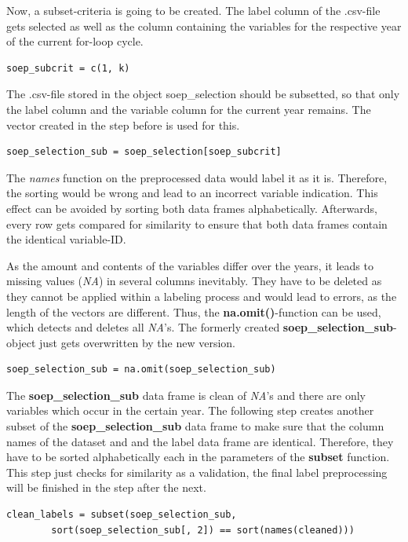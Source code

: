\documentclass[a4paper]{article}
\begin{document}
Now, a subset-criteria is going to be created. The label column of the .csv-file gets selected as well as the column containing the variables for the respective year of the current for-loop cycle.
\begin{lstlisting}[firstnumber=44]
    soep_subcrit = c(1, k)
\end{lstlisting}

The .csv-file stored in the object soep\_selection should be subsetted, so that only the label column and the variable column for the current year remains. The vector created in the step before is used for this.
\begin{lstlisting}[firstnumber=46]
    soep_selection_sub = soep_selection[soep_subcrit]
\end{lstlisting}

The \textit{names} function on the preprocessed data would label it as it is. Therefore, the sorting would be wrong and lead to an incorrect variable indication. This effect can be avoided by sorting both data frames alphabetically. Afterwards, every row gets compared for similarity to ensure that both data frames contain the identical variable-ID.

As the amount and contents of the variables differ over the years, it leads to missing values (\textit{NA}) in several columns inevitably. They have to be deleted as they cannot be applied within a labeling process and would lead to errors, as the length of the vectors are different. Thus, the \textbf{na.omit()}-function can be used, which detects and deletes all \textit{NA}'s. The formerly created \textbf{soep\_selection\_sub}-object just gets overwritten by the new version.
\begin{lstlisting}[firstnumber=48]
    soep_selection_sub = na.omit(soep_selection_sub)
\end{lstlisting}


The \textbf{soep\_selection\_sub} data frame is clean of \textit{NA}'s and there are only variables which occur in the certain year. The following step creates another subset of the  \textbf{soep\_selection\_sub} data frame to make sure that the column names of the dataset and and the label data frame are identical. Therefore, they have to be sorted alphabetically each in the parameters of the \textbf{subset} function. This step just checks for similarity as a validation, the final label preprocessing will be finished in the step after the next.
\begin{lstlisting}[firstnumber=50]
    clean_labels = subset(soep_selection_sub, 
    	sort(soep_selection_sub[, 2]) == sort(names(cleaned)))
\end{lstlisting}
\end{document}
